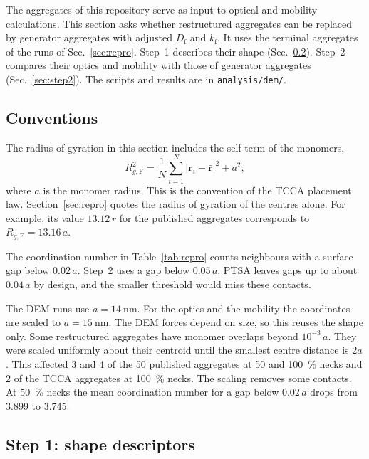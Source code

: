 \documentclass[11pt,a4paper]{article}
\newcommand{\Df}{D_\text{f}}
\begin{document}
The aggregates of this repository serve as input to optical and mobility calculations.
This section asks whether restructured aggregates can be replaced by generator aggregates with adjusted $\Df$ and $k_\text{f}$.
It uses the terminal aggregates of the runs of Sec.~\ref{sec:repro}.
Step~1 describes their shape (Sec.~\ref{sec:shape}).
Step~2 compares their optics and mobility with those of generator aggregates (Sec.~\ref{sec:step2}).
The scripts and results are in \texttt{analysis/dem/}.

\subsection{Conventions}
\label{sec:conventions}

The radius of gyration in this section includes the self term of the monomers,
\begin{equation}
  R_{g,\text{F}}^2 = \frac{1}{N}\sum_{i=1}^{N} \lvert \bm{r}_i - \bar{\bm{r}} \rvert^2 + a^2 ,
  \label{eq:rgf}
\end{equation}
where $a$ is the monomer radius.
This is the convention of the TCCA placement law.
Section~\ref{sec:repro} quotes the radius of gyration of the centres alone.
For example, its value $13.12\,r$ for the published aggregates corresponds to $R_{g,\text{F}} = 13.16\,a$.

The coordination number in Table~\ref{tab:repro} counts neighbours with a surface gap below $0.02\,a$.
Step~2 uses a gap below $0.05\,a$.
PTSA leaves gaps up to about $0.04\,a$ by design, and the smaller threshold would miss these contacts.

The DEM runs use $a = \SI{14}{\nano\meter}$.
For the optics and the mobility the coordinates are scaled to $a = \SI{15}{\nano\meter}$.
The DEM forces depend on size, so this reuses the shape only.
Some restructured aggregates have monomer overlaps beyond $10^{-3}\,a$.
They were scaled uniformly about their centroid until the smallest centre distance is $2a$.
This affected 3 and 4 of the 50 published aggregates at 50 and \SI{100}{\percent} necks and 2 of the TCCA aggregates at \SI{100}{\percent} necks.
The scaling removes some contacts.
At \SI{50}{\percent} necks the mean coordination number for a gap below $0.02\,a$ drops from 3.899 to 3.745.

\subsection{Step 1: shape descriptors}
\label{sec:shape}
\end{document}
